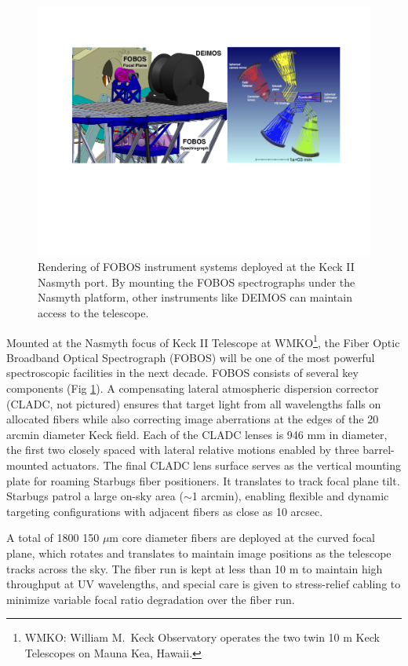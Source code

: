 \documentclass[oneside,11pt]{amsart}
\begin{document}
 \begin{figure}[h!]
  \vskip -0.1in
  \includegraphics[width=\textwidth]{figs/FOBOS_inst.pdf} %
  \caption{\small Rendering of FOBOS instrument systems deployed at the Keck II Nasmyth port.  By mounting the FOBOS spectrographs under the Nasmyth platform, other instruments like DEIMOS can maintain access to the telescope.}\label{fig:layout}
 \end{figure}

Mounted at the Nasmyth focus of Keck II Telescope at WMKO\footnote{WMKO: William M.\ Keck Observatory operates the two twin 10 m Keck Telescopes on Mauna Kea, Hawaii.}, the Fiber Optic Broadband Optical Spectrograph (FOBOS) will be one of
the most powerful spectroscopic facilities in the next decade.  FOBOS consists of several key components (Fig
\ref{fig:layout}).  A compensating lateral atmospheric dispersion corrector (CLADC, not pictured) ensures that target
light from all wavelengths falls on allocated fibers while also correcting image aberrations at the edges of the 20
arcmin diameter Keck field.  Each of the CLADC lenses is 946 mm in diameter, the first two closely spaced with lateral
relative motions enabled by three barrel-mounted actuators.  The final CLADC lens surface serves as the vertical
mounting plate for roaming Starbugs fiber positioners.  It translates to track focal plane tilt.  Starbugs patrol a
large on-sky area ($\sim$1 arcmin), enabling flexible and dynamic targeting configurations with adjacent fibers as
close as 10 arcsec.

A total of 1800 150 $\mu$m core diameter fibers are deployed at the curved focal plane, which rotates and translates to
maintain image positions as the telescope tracks across the sky.  The fiber run is kept at less than 10 m to
maintain high throughput at UV wavelengths, and special care is given to stress-relief cabling to minimize variable
focal ratio degradation over the fiber run.
\end{document}
